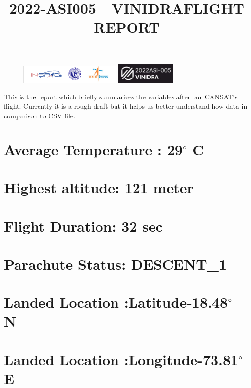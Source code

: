 \documentclass{article}
\title{2022-ASI005\Large—VINIDRA}
\begin{document}
\begin{figure}
\centering
\includegraphics[width=5cm]{inspace.png}  \hfill  \includegraphics[width=3cm]{team.png}

\end{figure}

\maketitle
{\Large This is the report which briefly summarizes the variables after our CANSAT's flight.
Currently it is a rough draft but it helps us better understand how data in comparison to CSV file.} 

\begin{center}
\title{\Large FLIGHT REPORT}   
\end{center}
\section{Average Temperature : 29$^{\circ}$ C}
\section{Highest altitude: 121 meter}
\section{Flight Duration: 32 sec}
\section{Parachute Status: DESCENT\_1 }
\section{Landed Location :Latitude-18.48$^{\circ}$ N }
\section{Landed Location :Longitude-73.81$^{\circ}$ E }
\end{document}
